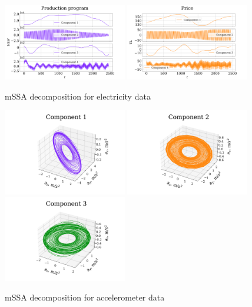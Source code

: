 \documentclass[referee, pdflatex, sn-mathphys-num]{sn-jnl}
\theoremstyle{definition}
\theoremstyle{plain}
\begin{document}
	\begin{figure}[h]
		\centering
		\includegraphics[width=0.48\textwidth, keepaspectratio]{Production_program_mssa.png}
		\includegraphics[width=0.48\textwidth, keepaspectratio]{Price_mssa.png}
		\caption{mSSA decomposition for electricity data}\label{fig:electr_decomp_mssa}
	\end{figure}
	
	\begin{figure}[h]
		\centering
		\includegraphics[width=0.48\textwidth, keepaspectratio]{acceler_1_mssa.png}
		\includegraphics[width=0.48\textwidth, keepaspectratio]{acceler_2_mssa.png}
		\includegraphics[width=0.48\textwidth, keepaspectratio]{acceler_3_mssa.png}
		\caption{mSSA decomposition for accelerometer data}\label{fig:accel_decomp_mssa}
	\end{figure}
	
\end{document}
